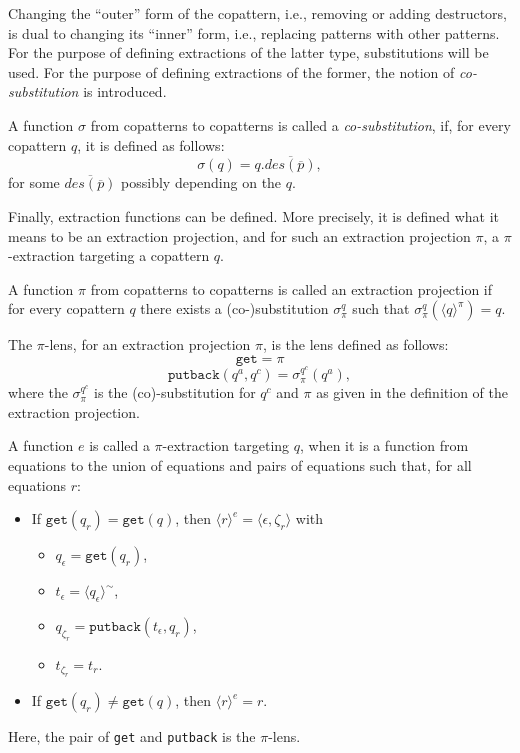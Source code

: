 Changing the ``outer'' form of the copattern, i.e., removing or adding destructors, is dual to changing its ``inner'' form, i.e., replacing patterns with other patterns. For the purpose of defining extractions of the latter type, substitutions will be used. For the purpose of defining extractions of the former, the notion of \textit{co-substitution} is introduced.

\begin{definition}[Co-substitution]
A function $\sigma$ from copatterns to copatterns is called a \textit{co-substitution}, if, for every copattern $q$, it is defined as follows:
\[
\sigma(q) = q.\overline{des(\overline{p})},
\]
for some $\overline{des(\overline{p})}$ possibly depending on the $q$.
\end{definition}

Finally, extraction functions can be defined. More precisely, it is defined what it means to be an extraction projection, and for such an extraction projection $\pi$, a $\pi$-extraction targeting a copattern $q$.

\begin{definition}
A function $\pi$ from copatterns to copatterns is called an extraction projection if for every copattern $q$ there exists a (co-)substitution $\sigma^q_\pi$ such that $\sigma^q_\pi(\langle q \rangle^\pi) = q$.
\end{definition}

\begin{definition}[$\pi$-lens]
The $\pi$-lens, for an extraction projection $\pi$, is the lens defined as follows:
\[
\mathtt{get} = \pi
\]
\[
\mathtt{putback}(q^a, q^c) = \sigma^{q^c}_\pi(q^a),
\]
where the $\sigma^{q^c}_\pi$ is the (co)-substitution for $q^c$ and $\pi$ as given in the definition of the extraction projection.
\end{definition}

\begin{definition}
A function $e$ is called a $\pi$-extraction targeting $q$, when it is a function from equations to the union of equations and pairs of equations such that, for all equations $r$:
\begin{itemize}
\item If $\mathtt{get}(q_r) = \mathtt{get}(q)$, then $\langle r \rangle^e = \big\langle \epsilon, \zeta_r \big\rangle$ with
\begin{itemize}
\item $q_\epsilon = \mathtt{get}(q_r)$,
\item $t_\epsilon = \langle q_\epsilon \rangle^{\sim}$,
\item $q_{\zeta_r} = \mathtt{putback}(t_\epsilon, q_r)$,
\item $t_{\zeta_r} = t_r$.
\end{itemize}

\item If $\mathtt{get}(q_r) \neq \mathtt{get}(q)$, then $\langle r \rangle^e = r$.
\end{itemize}
Here, the pair of \texttt{get} and \texttt{putback} is the $\pi$-lens.
\end{definition}

